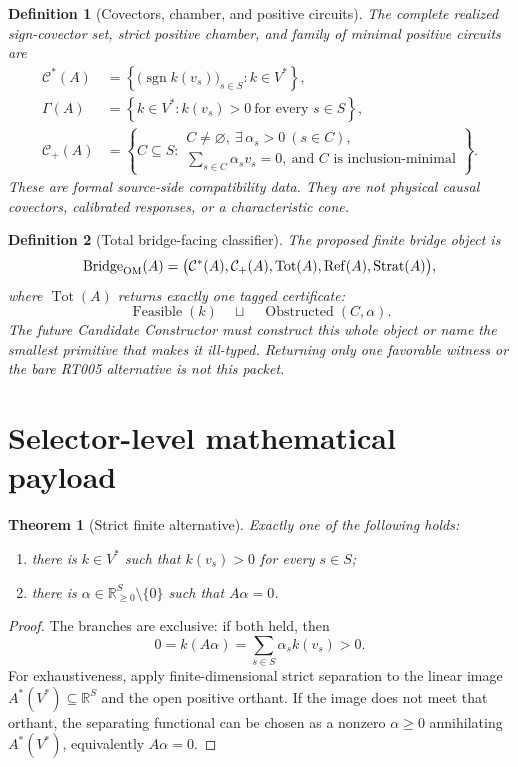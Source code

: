 \documentclass[11pt]{article}
\newtheorem{definition}{Definition}
\newtheorem{theorem}{Theorem}
\newcommand{\R}{\mathbb{R}}
\newcommand{\sgn}{\operatorname{sgn}}
\newcommand{\Cstar}{\mathcal{C}^{*}}
\newcommand{\Cplus}{\mathcal{C}_{+}}
\newcommand{\GammaA}{\Gamma}
\begin{document}
\begin{definition}[Covectors, chamber, and positive circuits]
The complete realized sign-covector set, strict positive chamber, and family
of minimal positive circuits are
\begin{align}
  \Cstar(A)
    &=\left\{\bigl(\sgn k(v_s)\bigr)_{s\in S}:k\in V^*\right\},\\
  \GammaA(A)
    &=\left\{k\in V^*:k(v_s)>0\ \text{for every }s\in S\right\},\\
  \Cplus(A)
    &=\left\{C\subseteq S:
      \begin{array}{l}
      C\ne\varnothing,\ \exists\,\alpha_s>0\ (s\in C),\\
      \sum_{s\in C}\alpha_s v_s=0,\ \text{and }C
      \text{ is inclusion-minimal}
      \end{array}
      \right\}.
\end{align}
These are formal source-side compatibility data.  They are not physical
causal covectors, calibrated responses, or a characteristic cone.
\end{definition}

\begin{definition}[Total bridge-facing classifier]
The proposed finite bridge object is
\[
  \operatorname{Bridge}_{\rm OM}(A)
   =\bigl(\Cstar(A),\Cplus(A),\operatorname{Tot}(A),
          \operatorname{Ref}(A),\operatorname{Strat}(A)\bigr),
\]
where \(\operatorname{Tot}(A)\) returns exactly one tagged certificate:
\[
  \operatorname{Feasible}(k)
  \quad\sqcup\quad
  \operatorname{Obstructed}(C,\alpha).
\]
The future Candidate Constructor must construct this whole object or name the
smallest primitive that makes it ill-typed.  Returning only one favorable
witness or the bare RT005 alternative is not this packet.
\end{definition}

\section{Selector-level mathematical payload}

\begin{theorem}[Strict finite alternative]
Exactly one of the following holds:
\begin{enumerate}
  \item there is \(k\in V^*\) such that \(k(v_s)>0\) for every \(s\in S\);
  \item there is \(\alpha\in\R_{\ge0}^{S}\setminus\{0\}\) such that
        \(A\alpha=0\).
\end{enumerate}
\end{theorem}
\begin{proof}
The branches are exclusive: if both held, then
\[
  0=k(A\alpha)=\sum_{s\in S}\alpha_s k(v_s)>0.
\]
For exhaustiveness, apply finite-dimensional strict separation to the linear
image \(A^*(V^*)\subseteq\R^S\) and the open positive orthant.  If the image
does not meet that orthant, the separating functional can be chosen as a
nonzero \(\alpha\ge0\) annihilating \(A^*(V^*)\), equivalently \(A\alpha=0\).
\end{proof}
\end{document}
